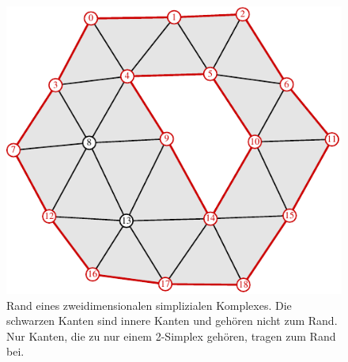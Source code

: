%
%
%
\begin{figure}
\centering
\includegraphics{chapters/120-topologie/images/rand.pdf}
\caption{Rand eines zweidimensionalen simplizialen Komplexes.
Die schwarzen Kanten sind innere Kanten und gehören nicht zum Rand.
Nur Kanten, die zu nur einem 2-Simplex gehören, tragen zum Rand bei.
\label{buch:topologie:homologie:fig:rand}}
\end{figure}
